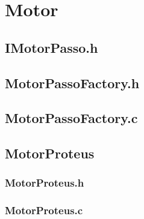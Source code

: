 \chapter{Motor}

\section{IMotorPasso.h}


	
\section{MotorPassoFactory.h}



\section{MotorPassoFactory.c}




\section{MotorProteus}

\subsection{MotorProteus.h}



\subsection{MotorProteus.c}


